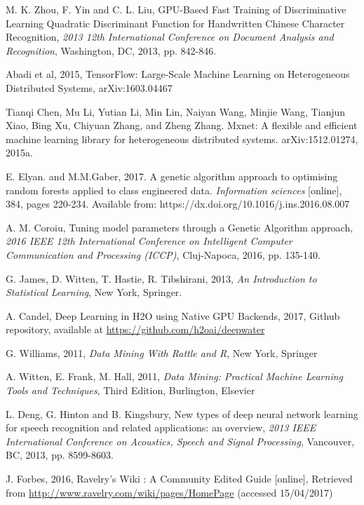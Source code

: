 \documentclass[journal]{IEEEtran}
\begin{document}
\begin{thebibliography}{30}
M. K. Zhou, F. Yin and C. L. Liu, GPU-Based Fast Training of Discriminative Learning Quadratic Discriminant Function for Handwritten Chinese Character Recognition, \emph{2013 12th International Conference on Document Analysis and Recognition}, Washington, DC, 2013, pp. 842-846.

Abadi et al, 2015, TensorFlow: Large-Scale Machine Learning on Heterogeneous Distributed Systems, 
arXiv:1603.04467  

Tianqi Chen, Mu Li, Yutian Li, Min Lin, Naiyan Wang, Minjie Wang, Tianjun Xiao, Bing Xu,
Chiyuan Zhang, and Zheng Zhang. Mxnet: A flexible and efficient machine learning library for
heterogeneous distributed systems. arXiv:1512.01274, 2015a.

E. Elyan. and M.M.Gaber, 2017. A genetic algorithm approach to optimising random forests applied to class engineered data. \emph{Information sciences} [online], 384, pages 220-234. Available from: https://dx.doi.org/10.1016/j.ins.2016.08.007

A. M. Coroiu, Tuning model parameters through a Genetic Algorithm approach, \emph{2016 IEEE 12th International Conference on Intelligent Computer Communication and Processing (ICCP)}, Cluj-Napoca, 2016, pp. 135-140.

G. James, D. Witten, T. Hastie, R. Tibshirani, 2013, \emph{An Introduction to Statistical Learning}, New York, Springer.

A. Candel, Deep Learning in H2O using Native GPU Backends, 2017, Github repository, available at \url{https://github.com/h2oai/deepwater}

G. Williams, 2011, \emph{Data Mining With Rattle and R}, New York, Springer

A. Witten, E. Frank, M. Hall, 2011, \emph{Data Mining: Practical Machine Learning Tools and Techniques}, Third Edition, Burlington, Elsevier

L. Deng, G. Hinton and B. Kingsbury,
 New types of deep neural network learning for speech recognition and related applications: an overview, \emph{2013 IEEE International Conference on Acoustics, Speech and Signal Processing}, Vancouver, BC, 2013, pp. 8599-8603.

J. Forbes, 2016, Ravelry’s Wiki : A Community Edited Guide [online], Retrieved from \url{http://www.ravelry.com/wiki/pages/HomePage} (accessed 15/04/2017)

\end{thebibliography}
\end{document}
